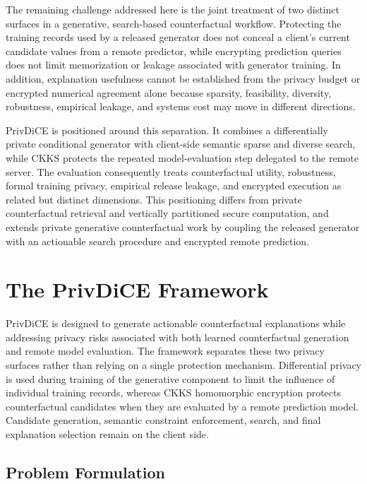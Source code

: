 \documentclass[preprint,12pt]{elsarticle}
\begin{document}
The remaining challenge addressed here is the joint treatment of two distinct
surfaces in a generative, search-based counterfactual workflow. Protecting the
training records used by a released generator does not conceal a client's
current candidate values from a remote predictor, while encrypting prediction
queries does not limit memorization or leakage associated with generator
training. In addition, explanation usefulness cannot be established from the
privacy budget or encrypted numerical agreement alone because sparsity,
feasibility, diversity, robustness, empirical leakage, and systems cost may
move in different directions.

PrivDiCE is positioned around this separation. It combines a differentially
private conditional generator with client-side semantic sparse and diverse
search, while CKKS protects the repeated model-evaluation step delegated to the
remote server. The evaluation consequently treats counterfactual utility,
robustness, formal training privacy, empirical release leakage, and encrypted
execution as related but distinct dimensions. This positioning differs from
private counterfactual retrieval and vertically partitioned secure computation,
and extends private generative counterfactual work by coupling the released
generator with an actionable search procedure and encrypted remote prediction.


\section{The PrivDiCE Framework}
\label{sec:methodology}

PrivDiCE is designed to generate actionable counterfactual explanations while
addressing privacy risks associated with both learned counterfactual generation
and remote model evaluation. The framework separates these two privacy surfaces
rather than relying on a single protection mechanism. Differential privacy is
used during training of the generative component to limit the influence of
individual training records, whereas CKKS homomorphic encryption protects
counterfactual candidates when they are evaluated by a remote prediction
model. Candidate generation, semantic constraint enforcement, search, and final
explanation selection remain on the client side.

\subsection{Problem Formulation}
\label{subsec:problem_formulation}
\end{document}
